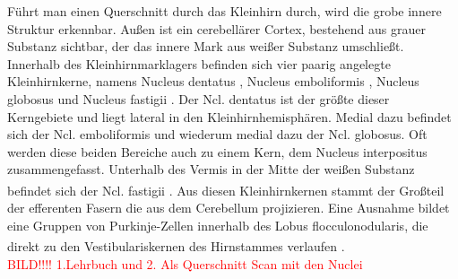 \documentclass[12pt,a4paper,pdftex]{article}
\begin{document}
Führt man einen Querschnitt durch das Kleinhirn durch, wird die grobe innere Struktur erkennbar. Außen ist ein cerebellärer Cortex, bestehend aus grauer Substanz sichtbar, der das innere Mark aus weißer Substanz umschließt. Innerhalb des Kleinhirnmarklagers befinden sich vier paarig angelegte Kleinhirnkerne, namens Nucleus dentatus , Nucleus emboliformis , Nucleus globosus  und Nucleus fastigii . Der Ncl. dentatus ist der größte dieser Kerngebiete und liegt lateral in den Kleinhirnhemisphären. Medial dazu befindet sich der Ncl. emboliformis und wiederum medial dazu der Ncl. globosus. Oft werden diese beiden Bereiche auch zu einem Kern, dem Nucleus interpositus  zusammengefasst. Unterhalb des Vermis in der Mitte der weißen Substanz befindet sich der Ncl. fastigii \textsuperscript{\cite[7]{trepel2011neuroanatomie}}. Aus diesen Kleinhirnkernen stammt der Großteil der efferenten Fasern die aus dem Cerebellum projizieren. Eine Ausnahme bildet eine Gruppen von Purkinje-Zellen innerhalb des Lobus flocculonodularis, die direkt zu den Vestibulariskernen des Hirnstammes verlaufen \textsuperscript{\cite[42]{kandel2013principles}}. \\        
\textcolor{red}{BILD!!!! 1.Lehrbuch und 2. Als Querschnitt Scan mit den Nuclei}
\end{document}
